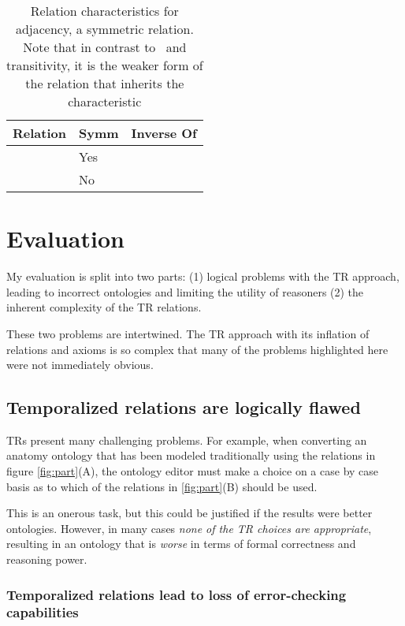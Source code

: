 \documentclass{bioinfo}
\def\partOf{\pr{part\_of}}
\def\adjacentTo{\pr{adjacent\_to}}
\def\atAllTimes{\pr{at-all-times}}
\def\atSomeTimes{\pr{at-some-times}}
\begin{document}
\begin{table}
\begin{tabular}{ | p{3cm} | p{1cm} | p{4cm} | }
\hline
\textbf{Relation} & \textbf{Symm} & \textbf{Inverse Of}  \\
\hline
\adjacentTo\ \atSomeTimes & Yes & \adjacentTo\ \atSomeTimes \\
\hline
\adjacentTo\ \atAllTimes & No & \\
\hline
\end{tabular}
\caption{Relation characteristics for adjacency, a symmetric
  relation. Note that in contrast to \partOf\ and transitivity, it is
  the weaker form of the relation that inherits the characteristic}
\label{tab:characteristics-adj}
\end{table}

\section{Evaluation}

My evaluation is split into two parts: (1) logical problems with the
TR approach, leading to incorrect ontologies and limiting the utility
of reasoners (2) the inherent complexity of the TR relations.

These two problems are intertwined. The TR approach with its inflation
of relations and axioms is so complex that many of the problems
highlighted here were not immediately obvious.

\subsection{Temporalized relations are logically flawed}

TRs present many challenging problems. For example, when converting an
anatomy ontology that has been modeled traditionally using the
relations in figure \ref{fig:part}(A), the ontology editor must make a
choice on a case by case basis as to which of the relations in
\ref{fig:part}(B) should be used.

This is an onerous task, but this could be justified if the results
were better ontologies. However, in many cases \emph{none of the
  TR choices are appropriate}, resulting in an ontology that is
\emph{worse} in terms of formal correctness and reasoning power.

\subsubsection{Temporalized relations lead to loss of error-checking
  capabilities}
\end{document}

